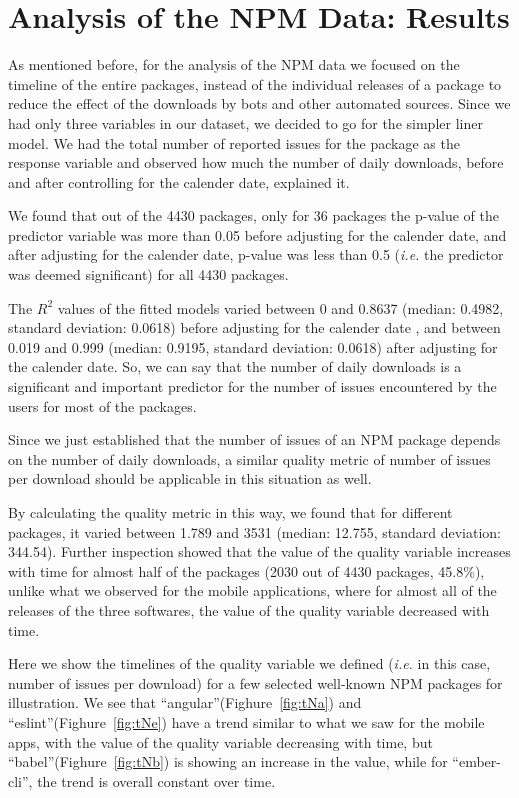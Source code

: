 \documentclass[smallextended]{svjour3}       %
\begin{document}
\section{Analysis of the NPM Data: Results}\label{s:npm}

As mentioned before, for the analysis of the NPM data we focused on the timeline of the entire packages, instead of the individual releases of a package to reduce the effect of the downloads by bots and other automated sources. Since we had only three variables in our dataset, we decided to go for the simpler liner model. We had the total number of reported issues for the package as the response variable and observed how much the number of daily downloads, before and after controlling for the calender date, explained it. 

We found that out of the 4430 packages, only for 36 packages the p-value of the predictor variable was more than 0.05 before adjusting for the calender date, and after adjusting for the calender date, p-value was less than 0.5 (\emph{i.e.} the predictor was deemed significant) for all 4430 packages. 

The $R^2$ values of the fitted models varied between 0 and 0.8637 (median: 0.4982, standard deviation: 0.0618) before adjusting for the calender date , and between 0.019 and 0.999 (median: 0.9195, standard deviation: 0.0618) after  adjusting for the calender date. So, we can say that the number of daily downloads is a significant and important predictor for the number of issues encountered by the users for most of the packages. 

Since we just established that the number of issues of an NPM package depends on the number of daily downloads, a similar quality metric of number of issues per download should be applicable in this situation as well. 

By calculating the quality metric in this way, we found that for different packages, it varied between 1.789 and 3531 (median: 12.755, standard deviation: 344.54). Further inspection showed that the value of the quality variable increases with time for almost half of the packages (2030 out of 4430 packages, 45.8\%), unlike what we observed for the mobile applications, where for almost all of the releases of the three softwares, the value of the quality variable decreased with time. 

Here we show the timelines of the quality variable we defined (\emph{i.e.} in this case, number of issues per download) for a few selected well-known NPM packages for illustration. We see that ``angular''(Fighure~\ref{fig:tNa}) and ``eslint''(Fighure~\ref{fig:tNe}) have a trend similar to what we saw for the mobile apps, with the value of the quality variable decreasing with time, but ``babel''(Fighure~\ref{fig:tNb}) is showing an increase in the value, while for ``ember-cli'', the trend is overall constant over time.
\end{document}
